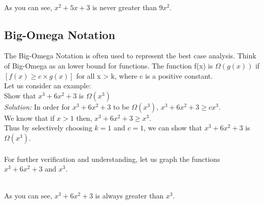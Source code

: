  \\
As you can see, $x^2 + 5x + 3$ is never greater than $9x^{2}$.

\subsection{Big-Omega Notation}
The Big-Omega Notation is often used to represent the best case analysis. Think
of Big-Omega as an lower bound for functions. The function f(x) is
$\Omega(g(x))$ if $[f(x) \geq c \times g(x)]$ for all x > k, where c is a
positive constant.\\
Let us consider an example: \\
Show that $x^{3} + 6x^{2} + 3$ is $\Omega(x^{3})$ \\
\indent \emph{Solution:} In order for $x^{3} + 6x^{2} + 3$ to be
$\Omega(x^{3})$, $x^{3} + 6x^{2} + 3 \geq cx^{3}$. \\
\indent \indent We know that if $x > 1$ then, $x^{3} + 6x^{2} + 3 \geq x^{3}$.
\\
\indent \indent Thus by selectively choosing $k = 1$ and $c = 1$, we can show
that $x^{3} + 6x^{2} + 3$ is $\Omega(x^{3})$. \\ \\
\noindent For further verification and understanding, let us graph the
functions $x^{3} + 6x^{2} + 3$ and $x^{3}$.

 \\
As you can see, $x^{3} + 6x^{2} + 3$ is always greater than $x^{3}$.
